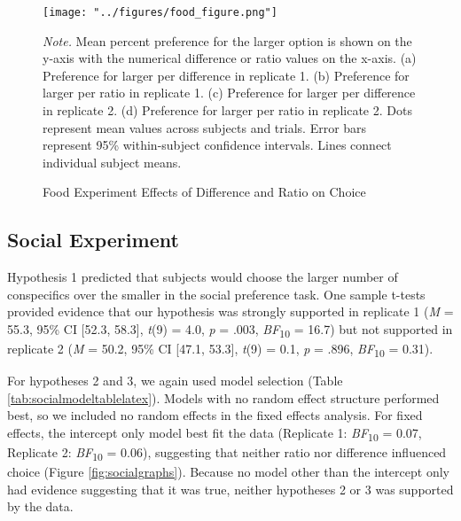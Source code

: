 \documentclass[
  ,pub,floatsintext]{apa6}
\begin{document}
\begin{figure}[h]
\caption{\newline Food Experiment Effects of Difference and Ratio on Choice \label{fig:foodgraphs}}
\begin{center}
\texttt{[image: "../figures/food\_figure.png"]}
\end{center}

\textit{Note.} Mean percent preference for the larger option is shown on the y-axis with the numerical difference or ratio values on the x-axis. (a) Preference for larger per difference in replicate 1.  (b) Preference for larger per ratio in replicate 1. (c) Preference for larger per difference in replicate 2. (d) Preference for larger per ratio in replicate 2. Dots represent mean values across subjects and trials. Error bars represent 95\% within-subject confidence intervals. Lines connect individual subject means.
\end{figure}

\hypertarget{social-experiment-1}{%
\subsection{Social Experiment}\label{social-experiment-1}}

Hypothesis 1 predicted that subjects would choose the larger number of conspecifics over the smaller in the social preference task. One sample t-tests provided evidence that our hypothesis was strongly supported in replicate 1 (\emph{M} = 55.3, 95\% CI {[}52.3, 58.3{]}, \emph{t}(9) = 4.0, \emph{p} = .003, \emph{BF}\textsubscript{10} = 16.7) but not supported in replicate 2 (\emph{M} = 50.2, 95\% CI {[}47.1, 53.3{]}, \emph{t}(9) = 0.1, \emph{p} = .896, \emph{BF}\textsubscript{10} = 0.31).

For hypotheses 2 and 3, we again used model selection (Table \ref{tab:socialmodeltablelatex}). Models with no random effect structure performed best, so we included no random effects in the fixed effects analysis. For fixed effects, the intercept only model best fit the data (Replicate 1: \emph{BF}\textsubscript{10} = 0.07, Replicate 2: \emph{BF}\textsubscript{10} = 0.06), suggesting that neither ratio nor difference influenced choice (Figure \ref{fig:socialgraphs}). Because no model other than the intercept only had evidence suggesting that it was true, neither hypotheses 2 or 3 was supported by the data.
\end{document}
